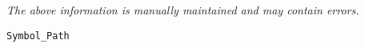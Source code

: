 \label{pkg:symbol\_path}

{\tiny \it The above information is manually maintained and may contain errors.}
\begin{verbatim}
Symbol_Path
\end{verbatim}
